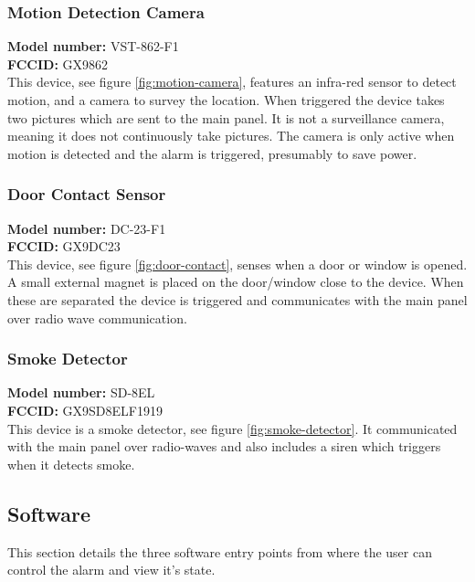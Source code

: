 \subsubsection{Motion Detection Camera}
\textbf{Model number:} VST-862-F1 \\
\textbf{FCCID:} GX9862 \\
This device, see figure \ref{fig:motion-camera}, features an infra-red sensor to detect motion, and a camera to survey the location. When triggered the device takes two pictures which are sent to the main panel. It is not a surveillance camera, meaning it does not continuously take pictures. The camera is only active when motion is detected and the alarm is triggered, presumably to save power.

\subsubsection{Door Contact Sensor}
\textbf{Model number:} DC-23-F1 \\
\textbf{FCCID:} GX9DC23 \\
This device, see figure \ref{fig:door-contact}, senses when a door or window is opened. A small external magnet is placed on the door/window close to the device. When these are separated the device is triggered and communicates with the main panel over radio wave communication.

\subsubsection{Smoke Detector}
\textbf{Model number:} SD-8EL \\
\textbf{FCCID:} GX9SD8ELF1919 \\
This device is a smoke detector, see figure \ref{fig:smoke-detector}. It communicated with the main panel over radio-waves and also includes a siren which triggers when it detects smoke.

\subsection{Software} \label{ch:system:software}
This section details the three software entry points from where the user can control the alarm and view it's state.

